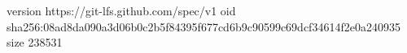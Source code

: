 version https://git-lfs.github.com/spec/v1
oid sha256:08ad8da090a3d06b0c2b5f84395f677cd6b9c90599c69dcf34614f2e0a240935
size 238531
